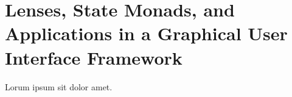 \section{Lenses, State Monads, and Applications in a Graphical User Interface Framework}
\label{sec:gui}


Lorum ipsum sit dolor amet.  \lipsum[2-4]